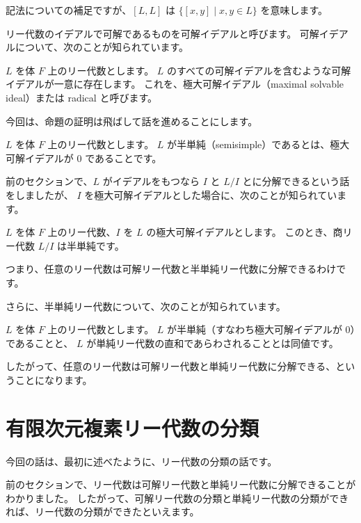 \documentclass{ltjsarticle}
\begin{document}
記法についての補足ですが、$[L, L]$ は $\{ [x, y] \mid x, y \in L \}$ を意味します。

リー代数のイデアルで可解であるものを可解イデアルと呼びます。
可解イデアルについて、次のことが知られています。

\begin{proposition}[極大可解イデアル]
    $L$ を体 $F$ 上のリー代数とします。
    $L$ のすべての可解イデアルを含むような可解イデアルが一意に存在します。
    これを、極大可解イデアル（maximal solvable ideal）または radical と呼びます。
\end{proposition}

今回は、命題の証明は飛ばして話を進めることにします。

\begin{definition}[半単純]
    $L$ を体 $F$ 上のリー代数とします。
    $L$ が半単純（semisimple）であるとは、極大可解イデアルが $0$ であることです。
\end{definition}

前のセクションで、$L$ がイデアルをもつなら $I$ と $L/I$ とに分解できるという話をしましたが、
$I$ を極大可解イデアルとした場合に、次のことが知られています。

\begin{proposition}[極大可解イデアルによる商]
    $L$ を体 $F$ 上のリー代数、$I$ を $L$ の極大可解イデアルとします。
    このとき、商リー代数 $L/I$ は半単純です。
\end{proposition}

つまり、任意のリー代数は可解リー代数と半単純リー代数に分解できるわけです。

さらに、半単純リー代数について、次のことが知られています。

\begin{proposition}[単純と半単純]
    $L$ を体 $F$ 上のリー代数とします。
    $L$ が半単純（すなわち極大可解イデアルが $0$）であることと、
    $L$ が単純リー代数の直和であらわされることとは同値です。
\end{proposition}

したがって、任意のリー代数は可解リー代数と単純リー代数に分解できる、ということになります。

\section{有限次元複素リー代数の分類}

今回の話は、最初に述べたように、リー代数の分類の話です。

前のセクションで、リー代数は可解リー代数と単純リー代数に分解できることがわかりました。
したがって、可解リー代数の分類と単純リー代数の分類ができれば、リー代数の分類ができたといえます。
\end{document}
